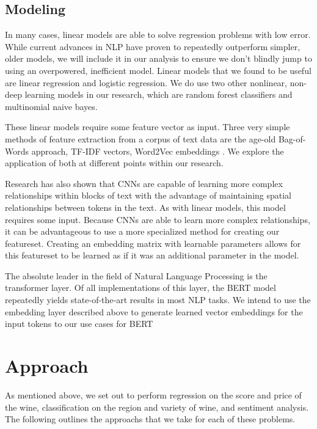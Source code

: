 \documentclass[12pt]{IEEEtran}
\begin{document}
\subsection{Modeling}
    In many cases, linear models are able to solve regression problems with low error. While current advances in NLP have proven to repeatedly outperform simpler, older models, we will include it in our analysis to ensure we don't blindly jump to using an overpowered, inefficient model. Linear models that we found to be useful are linear regression and logistic regression. We do use two other nonlinear, non-deep learning models in our research, which are random forest classifiers and multinomial naive bayes. \par
    These linear models require some feature vector as input. Three very simple methods of feature extraction from a corpus of text data are the age-old Bag-of-Words approach\cite{bag_of_words}, TF-IDF vectors, Word2Vec embeddings \cite{word2vec}. We explore the application of both at different points within our research.\par
    Research has also shown that CNNs are capable of learning more complex relationships within blocks of text with the advantage of maintaining spatial relationships between tokens in the text\cite{cnn}. As with linear models, this model requires some input. Because CNNs are able to learn more complex relationships, it can be advantageous to use a more specialized method for creating our featureset. Creating an embedding matrix with learnable parameters allows for this featureset to be learned as if it was an additional parameter in the model.\par
    The absolute leader in the field of Natural Language Processing is the transformer layer. Of all implementations of this layer, the BERT model repeatedly yields state-of-the-art results in most NLP tasks\cite{bert}. We intend to use the embedding layer described above to generate learned vector embeddings for the input tokens to our use cases for BERT 

\section{Approach}
    As mentioned above, we set out to perform regression on the score and price of the wine, classification on the region and variety of wine, and sentiment analysis. The following outlines the approachs that we take for each of these problems.
\end{document}
